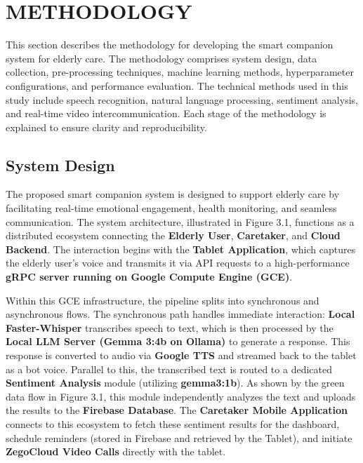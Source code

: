 \chapter{METHODOLOGY}
\hspace{\parindent} 
This section describes the methodology for developing the smart companion system for elderly care. The methodology comprises system design, data collection, pre-processing techniques, machine learning methods, hyperparameter configurations, and performance evaluation. The technical methods used in this study include speech recognition, natural language processing, sentiment analysis, and real-time video intercommunication. Each stage of the methodology is explained to ensure clarity and reproducibility.
\section{System Design}
{ 
	\setlength{\leftskip}{1cm}
	\setlength{\parindent}{2.5em}
	The proposed smart companion system is designed to support elderly care by facilitating real-time emotional engagement, health monitoring, and seamless communication. The system architecture, illustrated in Figure 3.1, functions as a distributed ecosystem connecting the \textbf{Elderly User}, \textbf{Caretaker}, and \textbf{Cloud Backend}. The interaction begins with the \textbf{Tablet Application}, which captures the elderly user's voice and transmits it via API requests to a high-performance \textbf{gRPC server running on Google Compute Engine (GCE)}.
	\par
}
{ 
	\setlength{\leftskip}{1cm}
	\setlength{\parindent}{2.5em}
	Within this GCE infrastructure, the pipeline splits into synchronous and asynchronous flows. The synchronous path handles immediate interaction: \textbf{Local Faster-Whisper} transcribes speech to text, which is then processed by the \textbf{Local LLM Server (Gemma 3:4b on Ollama)} to generate a response. This response is converted to audio via \textbf{Google TTS} and streamed back to the tablet as a bot voice. Parallel to this, the transcribed text is routed to a dedicated \textbf{Sentiment Analysis} module (utilizing \textbf{gemma3:1b}). As shown by the green data flow in Figure 3.1, this module independently analyzes the text and uploads the results to the \textbf{Firebase Database}. The \textbf{Caretaker Mobile Application} connects to this ecosystem to fetch these sentiment results for the dashboard, schedule reminders (stored in Firebase and retrieved by the Tablet), and initiate \textbf{ZegoCloud Video Calls} directly with the tablet.
	\par
}

